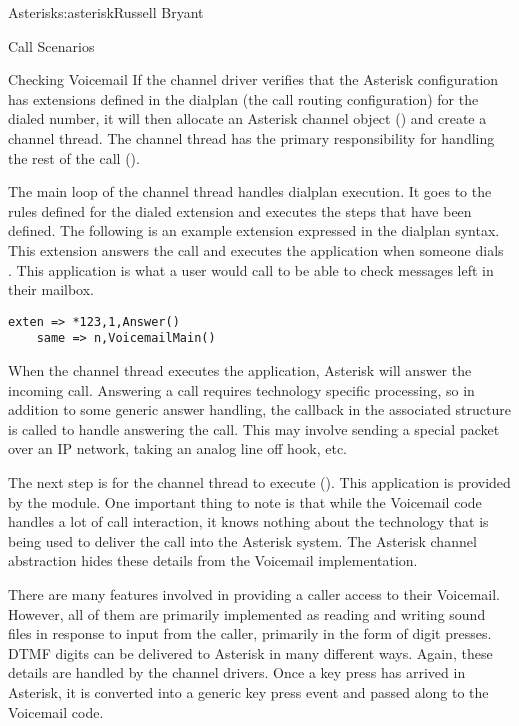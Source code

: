 \begin{aosachapter}{Asterisk}{s:asterisk}{Russell Bryant}
\begin{aosasect1}{Call Scenarios}
\begin{aosasect2}{Checking Voicemail}
If the channel driver verifies that the Asterisk configuration has
extensions defined in the dialplan (the call routing configuration)
for the dialed number, it will then allocate an Asterisk channel
object () and create a channel thread. The channel
thread has the primary responsibility for handling the rest of the
call ().


The main loop of the channel thread handles dialplan execution. It
goes to the rules defined for the dialed extension and executes the
steps that have been defined. The following is an example extension
expressed in the  dialplan syntax.  This
extension answers the call and executes the 
application when someone dials . This application is what a
user would call to be able to check messages left in their mailbox.

\begin{verbatim}
exten => *123,1,Answer()
    same => n,VoicemailMain()
\end{verbatim}

\noindent When the channel thread executes the  application,
Asterisk will answer the incoming call. Answering a call requires
technology specific processing, so in addition to some generic answer
handling, the  callback in the associated
 structure is called to handle answering the
call. This may involve sending a special packet over an IP network,
taking an analog line off hook, etc.

The next step is for the channel thread to execute
(). This application is
provided by the  module. One important thing to
note is that while the Voicemail code handles a lot of call
interaction, it knows nothing about the technology that is being used
to deliver the call into the Asterisk system. The Asterisk channel
abstraction hides these details from the Voicemail implementation.

There are many features involved in providing a caller access to their
Voicemail. However, all of them are primarily implemented as reading
and writing sound files in response to input from the caller,
primarily in the form of digit presses. DTMF digits can be delivered
to Asterisk in many different ways. Again, these details are handled
by the channel drivers. Once a key press has arrived in Asterisk, it
is converted into a generic key press event and passed along to the
Voicemail code.


\end{aosasect2}
\end{aosasect1}
\end{aosachapter}
